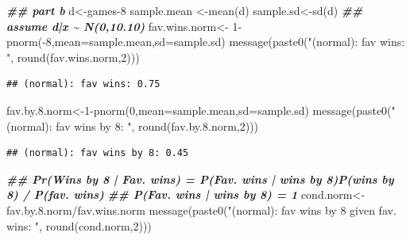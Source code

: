\documentclass[
]{book}
\newenvironment{Shaded}{\begin{snugshade}}{\end{snugshade}}
\newcommand{\AttributeTok}[1]{\textcolor[rgb]{0.77,0.63,0.00}{#1}}
\newcommand{\DecValTok}[1]{\textcolor[rgb]{0.00,0.00,0.81}{#1}}
\newcommand{\DocumentationTok}[1]{\textcolor[rgb]{0.56,0.35,0.01}{\textbf{\textit{#1}}}}
\newcommand{\FloatTok}[1]{\textcolor[rgb]{0.00,0.00,0.81}{#1}}
\newcommand{\FunctionTok}[1]{\textcolor[rgb]{0.00,0.00,0.00}{#1}}
\newcommand{\NormalTok}[1]{#1}
\newcommand{\OtherTok}[1]{\textcolor[rgb]{0.56,0.35,0.01}{#1}}
\newcommand{\SpecialCharTok}[1]{\textcolor[rgb]{0.00,0.00,0.00}{#1}}
\newcommand{\StringTok}[1]{\textcolor[rgb]{0.31,0.60,0.02}{#1}}
\theoremstyle{definition}
\theoremstyle{definition}
\theoremstyle{definition}
\theoremstyle{definition}
\theoremstyle{remark}
\begin{document}
\begin{Shaded}
\begin{Highlighting}[]
\DocumentationTok{\#\# part b}
\NormalTok{  d}\OtherTok{\textless{}{-}}\NormalTok{games}\DecValTok{{-}8}
\NormalTok{  sample.mean }\OtherTok{\textless{}{-}}\FunctionTok{mean}\NormalTok{(d)}
\NormalTok{  sample.sd}\OtherTok{\textless{}{-}}\FunctionTok{sd}\NormalTok{(d)}
  \DocumentationTok{\#\# assume  d|x \textasciitilde{} N(0,10.10)}
\NormalTok{  fav.wins.norm}\OtherTok{\textless{}{-}} \DecValTok{1}\SpecialCharTok{{-}}\FunctionTok{pnorm}\NormalTok{(}\SpecialCharTok{{-}}\DecValTok{8}\NormalTok{,}\AttributeTok{mean=}\NormalTok{sample.mean,}\AttributeTok{sd=}\NormalTok{sample.sd)}
   \FunctionTok{message}\NormalTok{(}\FunctionTok{paste0}\NormalTok{(}\StringTok{"(normal): fav wins: "}\NormalTok{, }\FunctionTok{round}\NormalTok{(fav.wins.norm,}\DecValTok{2}\NormalTok{)))}
\end{Highlighting}
\end{Shaded}

\begin{verbatim}
## (normal): fav wins: 0.75
\end{verbatim}

\begin{Shaded}
\begin{Highlighting}[]
\NormalTok{  fav.by.}\FloatTok{8.}\NormalTok{norm}\OtherTok{\textless{}{-}}\DecValTok{1}\SpecialCharTok{{-}}\FunctionTok{pnorm}\NormalTok{(}\DecValTok{0}\NormalTok{,}\AttributeTok{mean=}\NormalTok{sample.mean,}\AttributeTok{sd=}\NormalTok{sample.sd)}
    \FunctionTok{message}\NormalTok{(}\FunctionTok{paste0}\NormalTok{(}\StringTok{"(normal): fav wins by 8: "}\NormalTok{, }\FunctionTok{round}\NormalTok{(fav.by.}\FloatTok{8.}\NormalTok{norm,}\DecValTok{2}\NormalTok{)))}
\end{Highlighting}
\end{Shaded}

\begin{verbatim}
## (normal): fav wins by 8: 0.45
\end{verbatim}

\begin{Shaded}
\begin{Highlighting}[]
\DocumentationTok{\#\# Pr(Wins by 8 | Fav. wins) = P(Fav. wins | wins by 8)P(wins by 8) / P(fav. wins)}
    \DocumentationTok{\#\# P(Fav. wins | wins by 8) = 1}
\NormalTok{  cond.norm}\OtherTok{\textless{}{-}}\NormalTok{fav.by.}\FloatTok{8.}\NormalTok{norm}\SpecialCharTok{/}\NormalTok{fav.wins.norm}
   \FunctionTok{message}\NormalTok{(}\FunctionTok{paste0}\NormalTok{(}\StringTok{"(normal): fav wins by 8 given fav. wins: "}\NormalTok{, }\FunctionTok{round}\NormalTok{(cond.norm,}\DecValTok{2}\NormalTok{)))}
\end{Highlighting}
\end{Shaded}
\end{document}
